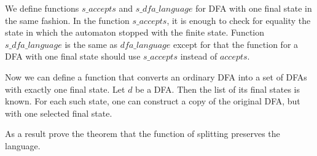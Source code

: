 
We define functions $\textit{s\_accepts}$ and $\textit{s\_dfa\_language}$ for DFA with one final state in the same fashion.
In the function $\textit{s\_accepts}$, it is enough to check for equality the state in which the automaton stopped with the finite state. Function $\textit{s\_dfa\_language}$ is the same as  $\textit{dfa\_language}$ except for that the function for a DFA with one final state should use $\textit{s\_accepts}$ instead of $\textit{accepts}$.

Now we can define a function that converts an ordinary DFA into a set of DFAs with exactly one final state.
Let $d$ be a DFA. Then the list of its final states is known.
For each such state, one can construct a copy of the original DFA, but with one selected final state.





As a result prove the theorem that the function of splitting preserves the language.


